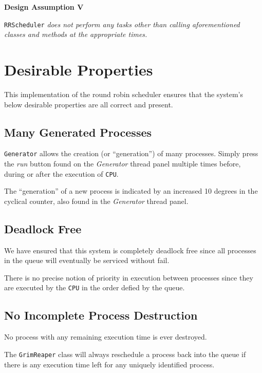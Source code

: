 \documentclass[]{report}
\begin{document}
\begin{mdframed}[backgroundcolor=lightgray!40]
	\textbf{Design Assumption V} \par 
	\verb|RRScheduler| \textit{does not perform any tasks other than calling aforementioned classes and methods at the appropriate times.}
\end{mdframed}

\newpage 

\section*{Desirable Properties}
This implementation of the round robin scheduler ensures that the system's below desirable properties are all correct and present.

\subsection*{Many Generated Processes}
\verb|Generator| allows the creation (or ``generation'') of many processes. Simply press the \textit{run} button found on the \textit{Generator} thread panel multiple times before, during or after the execution of \verb|CPU|. \par 
The ``generation'' of a new process is indicated by an increased 10 degrees in the cyclical counter, also found in the \textit{Generator} thread panel. 

\vspace{2mm}

\subsection*{Deadlock Free}
We have ensured that this system is completely deadlock free since all processes in the queue will eventually be serviced without fail. \par 
There is no precise notion of priority in execution between processes since they are executed by the \verb|CPU| in the order defied by the queue.

\vspace{2mm}

\subsection*{No Incomplete Process Destruction}
No process with any remaining execution time is ever destroyed. \par 
The \verb|GrimReaper| class will always reschedule a process back into the queue if there is any execution time left for any uniquely identified process.
\end{document}
